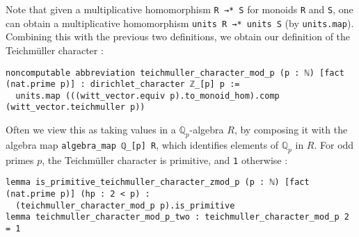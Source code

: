 \documentclass[a4paper,UKenglish,cleveref, autoref, thm-restate]{lipics-v2021}
\newcommand{\lean}[1]{\texttt{#1}\xspace} %
\begin{document}
Note that given a multiplicative homomorphism \lean{R →* S} for monoids \lean{R} 
and \lean{S}, one can obtain a multiplicative homomorphism \lean{units R →* units S} 
(by \lean{units.map}). Combining this with the previous two 
definitions, we obtain our definition of the Teichmüller character : 
\begin{lstlisting}
noncomputable abbreviation teichmuller_character_mod_p (p : ℕ) [fact (nat.prime p)] : dirichlet_character ℤ_[p] p :=
  units.map (((witt_vector.equiv p).to_monoid_hom).comp (witt_vector.teichmuller p))
\end{lstlisting}
Often we view this as taking values in a $\mathbb{Q}_p$-algebra $R$, by composing it 
with the algebra map \lean{algebra\_map ℚ\_[p] R}, which identifies elements of $\mathbb{Q}_p$ 
in $R$. \newline
For odd primes $p$, the Teichmüller character is primitive, and \lean{1} otherwise : 
\begin{lstlisting}
lemma is_primitive_teichmuller_character_zmod_p (p : ℕ) [fact (nat.prime p)] (hp : 2 < p) : 
  (teichmuller_character_mod_p p).is_primitive
lemma teichmuller_character_mod_p_two : teichmuller_character_mod_p 2 = 1
\end{lstlisting}
\end{document}
